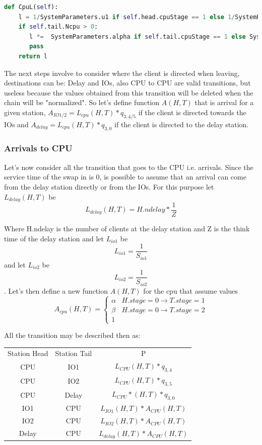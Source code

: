 \documentclass[12pt,a4paper]{article}
\begin{document}
\begin{lstlisting}[language=python]
def CpuL(self):
    l = 1/SystemParameters.u1 if self.head.cpuStage == 1 else 1/SystemParameters.u2
    if self.tail.Ncpu > 0:
       l *=  SystemParameters.alpha if self.tail.cpuStage == 1 else SystemParameters.beta
       pass
    return l
\end{lstlisting}

The next steps involve to consider where the client is directed when leaving, destinations can be: Delay and IOs, also CPU to CPU are valid transitions, but useless because the values obtained from this transition will be deleted when the chain will be "normalized". So let's define function $A(H,T)$ that is arrival for a given station, $A_{IO1/2}=L_{cpu}(H,T)*q_{3,4/5}$ if the client is directed towards the IOs and $A_{delay}=L_{cpu}(H,T)*q_{3,0}$ if the client is directed to the delay station. 


\subsubsection{Arrivals to CPU}
Let's now consider all the transition that goes to the CPU i.e. arrivals. Since the service time of the swap in is 0, is possible to assume that an arrival can come from the delay station directly or from the IOs. For this purpose let $L_{delay}(H,T)$ be 
$$
L_{delay}(H,T)= H.ndelay*\frac{1}{Z}
$$

Where H.ndelay is the number of clients at the delay station and Z is the think time of the delay station and let $L_{io1}$ be
$$
    L_{io1} = \frac{1}{S_{io1}}  
$$ and let $L_{io2}$ be 
$$
    L_{io2}= \frac{1}{S_{io2}}
$$
. Let's then define a new function $A(H,T)$ for the cpu that assume values 
$$
A_{cpu}(H,T)=
\begin{cases}
    \alpha & H.stage = 0 \rightarrow T.stage = 1 \\
    \beta & H.stage = 0 \rightarrow T.stage = 2 \\
    1
\end{cases}
$$


All the transition may be described then as:

\begin{center}
    \begin{tabular}{ |c|c|c| } 
     \hline
     Station Head & Station Tail & P \\ 
     CPU & IO1 & $L_{CPU}(H,T)* q_{3,4}$ \\
     CPU & IO2 & $L_{CPU}(H,T)* q_{3,5}$\\
     CPU & Delay & $L_{CPU}*(H,T) * q_{3,0}$ \\ 
     IO1 & CPU & $L_{IO1}(H,T) * A_{CPU}(H,T)$ \\
     IO2& CPU & $L_{IO2}(H,T)* A_{CPU}(H,T)$ \\
     Delay & CPU & $L_{delay}(H,T)*A_{CPU}(H,T)$\\
     \hline
    \end{tabular}
    \end{center}
\end{document}

